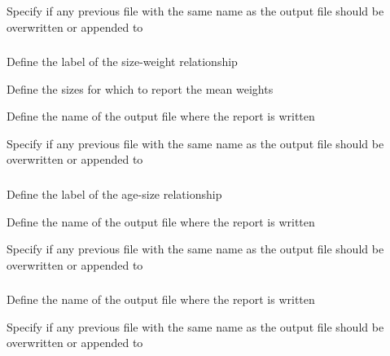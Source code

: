  {Specify if any previous file with the same name as the output file should be overwritten or appended to}

\subsubsection[Print mean weight at size]{}

 {Define the label of the size-weight relationship}

 {Define the sizes for which to report the mean weights}

 {Define the name of the output file where the report is written}

 {Specify if any previous file with the same name as the output file should be overwritten or appended to}

\subsubsection[Print mean weight at age]{}

 {Define the label of the age-size relationship}

 {Define the name of the output file where the report is written}

 {Specify if any previous file with the same name as the output file should be overwritten or appended to}

\subsubsection[Printing the results of an MCMC]{}

 {Define the name of the output file where the report is written}

 {Specify if any previous file with the same name as the output file should be overwritten or appended to}

